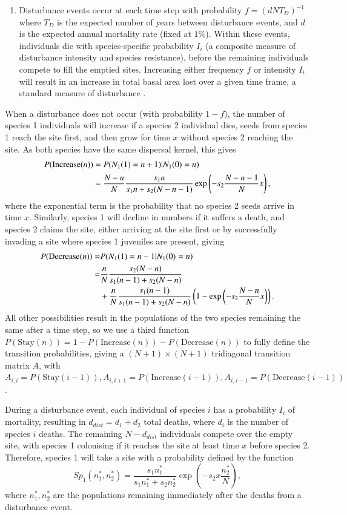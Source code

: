 \documentclass[a4paper]{article}
\begin{document}
\begin{enumerate}
\item Disturbance events occur at each time step with probability $f=(dNT_D)^{-1}$ where $T_D$ is the expected number of years between disturbance events, and $d$ is the expected annual mortality rate (fixed at $1\%$). Within these events, individuals die with species-specific probability $I_i$ (a composite measure of disturbance intensity and species resistance), before the remaining individuals compete to fill the emptied sites. Increasing either frequency $f$ or intensity $I_i$ will result in an increase in total basal area lost over a given time frame, a standard measure of disturbance \citep[e.g.][]{molino2001tree,peterson1997tornado}.
\end{enumerate}
When a disturbance does not occur (with probability $1-f$), the number of species 1 individuals will increase if a species 2 individual dies, seeds from species 1 reach the site first, and then grow for time $x$ without species 2 reaching the site. As both species have the same dispersal kernel, this gives
\begin{align}
\label{increase}
P(\text{Increase}(n))&=P(N_1(1)=n+1)|N_1(0)=n) \\
&=\frac{N-n}{N}\frac{s_1 n}{s_1 n +s_2(N-n-1)}\exp \left( -s_2 \frac{N-n-1}{N} x\right),\notag \end{align}
where the exponential term is the probability that no species 2 seeds arrive in time $x$. Similarly, species 1 will decline in numbers if it suffers a death, and species 2 claims the site, either arriving at the site first or by successfully invading a site where species 1 juveniles are present, giving
\begin{align}
\label{decrease}
P(\text{Decrease}(n))=&P(N_1(1)=n-1 | N_1(0)=n)  \\ 
=&\frac{n}{N}\frac{s_2 (N-n)}{s_1 (n-1) +s_2(N-n)} \notag \\
& + \frac{n}{N}\frac{s_1 (n-1)}{s_1 (n-1) +s_2(N-n)}\left(1-\exp \left( -s_2 \frac{N-n}{N} x\right)\right). \notag \end{align}
All other possibilities result in the populations of the two species remaining the same after a time step, so we use a third function $P(\text{Stay}(n))=1-P(\text{Increase}(n))-P(\text{Decrease}(n))$ to fully define the transition probabilities, giving a $(N+1) \times (N+1)$ tridiagonal transition matrix $A$, with $A_{i,i}=P(\text{Stay}(i-1)), A_{i,i+1}=P(\text{Increase}(i-1)), A_{i,i-1}=P(\text{Decrease}(i-1))$.

During a disturbance event, each individual of species $i$ has a probability $I_i$ of mortality, resulting in $d_{dist}=d_1+d_2$ total deaths, where $d_i$ is the number of species $i$ deaths. The remaining $N-d_{dist}$ individuals compete over the empty site, with species 1 colonising if it reaches the site at least time $x$ before species 2. Therefore, species 1 will take a site with a probability defined by the function
\begin{equation}
\label{sp1}
Sp_1(n_1^*,n_2^*)=\frac{s_1 n_1^*}{s_1n_1^*+s_2n_2^*}\exp \left(-s_2 x\frac{n_2^*}{N}\right),
\end{equation}
where $n_1^*,n_2^*$ are the populations remaining immediately after the deaths from a disturbance event.
\end{document}

